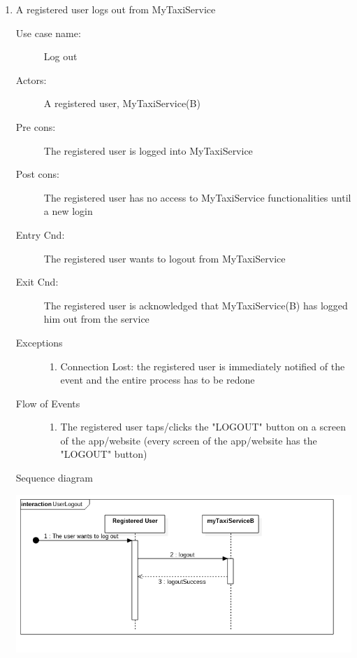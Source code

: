 \documentclass[11pt,titlepage]{article} %
\begin{document}
\begin{enumerate}
	       \item A registered user logs out from MyTaxiService
		\begin{description}
		        \item [Use case name:] Log out
		        \item [Actors:] A registered user, MyTaxiService(B)
		        \item [Pre cons:] The registered user is logged into MyTaxiService
		        \item [Post cons:] The registered user has no access to MyTaxiService functionalities
		        until a new login
		        \item [Entry Cnd:] The registered user wants to logout from MyTaxiService
		        \item [Exit Cnd:] The registered user is acknowledged that MyTaxiService(B) has logged him out from
		        the service
		        \item [Exceptions]\hfill
			\begin{enumerate}
			          \item Connection Lost: the registered user is immediately notified of the event and the entire process
			          has to be redone
			\end{enumerate}
		        \item [Flow of Events]\hfill
			\begin{enumerate}
			          \item The registered user taps/clicks the "LOGOUT" button on a screen of the app/website
			          (every screen of the app/website has the "LOGOUT" button)
			\end{enumerate}
		\end{description}
		\newpage
		Sequence diagram
		\begin{center}
		\includegraphics[scale=0.52]{usecase7.png}
		\end{center}
	

\end{enumerate}
\end{document}
